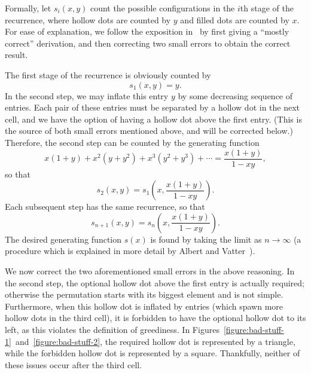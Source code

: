\documentclass[10pt]{article}
\theoremstyle{plain}
\newcommand{\ds}{\displaystyle}
\newcommand{\pa}[1]{\left({#1}\right)}
\newcommand{\f}[2]{\ds\frac{{#1}}{{#2}}}
\begin{document}
Formally, let $s_i(x,y)$ count the possible configurations in the $i$th stage of the recurrence, where hollow dots are counted by $y$ and filled dots are counted by $x$. For ease of explanation, we follow the exposition in~\cite{albert:generating-and-:} by first giving a ``mostly correct'' derivation, and then correcting two small errors to obtain the correct result.

The first stage of the recurrence is obviously counted by 
	\[s_1(x,y) = y.\]
In the second step, we may inflate this entry $y$ by some decreasing sequence of entries. Each pair of these entries must be separated by a hollow dot in the next cell, and we have the option of having a hollow dot above the first entry. (This is the source of both small errors mentioned above, and will be corrected below.) Therefore, the second step can be counted by the generating function
	\[x(1+y) + x^2(y+y^2) + x^3(y^2 + y^3) + \cdots = \f{x(1+y)}{1-xy},\]
so that
	\[s_2(x,y) = s_1\pa{x, \f{x(1+y)}{1-xy}}.\]
Each subsequent step has the same recurrence, so that
	\[s_{n+1}(x,y) = s_n\pa{x, \f{x(1+y)}{1-xy}}.\]
The desired generating function $s(x)$ is found by taking the limit as $n \to \infty$ (a procedure which is explained in more detail by Albert and Vatter~\cite{albert:generating-and-:}).

We now correct the two aforementioned small errors in the above reasoning. In the second step, the optional hollow dot above the first entry is actually required; otherwise the permutation starts with its biggest element and is not simple. Furthermore, when this hollow dot is inflated by entries (which spawn more hollow dots in the third cell), it is forbidden to have the optional hollow dot to its left, as this violates the definition of greediness. In Figures~\ref{figure:bad-stuff-1}~and~\ref{figure:bad-stuff-2}, the required hollow dot is represented by a triangle, while the forbidden hollow dot is represented by a square. Thankfully, neither of these issues occur after the third cell.
\end{document}
